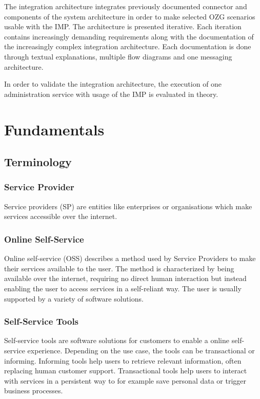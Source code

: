 \documentclass[
     12pt,         %
     a4paper,      %
     BCOR=10mm,version=first,     %
     DIV=14,version=first,        %
     ]{scrreprt}
\begin{document}
The integration architecture integrates previously documented connector and components of the system architecture in order to make selected OZG scenarios usable with the IMP. The architecture is presented iterative. Each iteration contains increasingly demanding requirements along with the documentation of the increasingly complex integration architecture. Each documentation is done through textual explanations, multiple flow diagrams and one messaging architecture.

In order to validate the integration architecture, the execution of one administration service with usage of the IMP is evaluated in theory.

\chapter{Fundamentals}

\section{Terminology}

\subsection{Service Provider}
Service providers (SP) are entities like enterprises or organisations which make services accessible over the internet.

\subsection{Online Self-Service}
Online self-service (OSS) describes a method used by Service Providers to make their services available to the user. The method is characterized by being available over the internet, requiring no direct human interaction but instead enabling the user to access services in a self-reliant way. The user is usually supported by a variety of software solutions.

\subsection{Self-Service Tools}
Self-service tools are software solutions for customers to enable a online self-service experience. Depending on the use case, the tools can be transactional or informing. Informing tools help users to retrieve relevant information, often replacing human customer support. Transactional tools help users to interact with services in a persistent way to for example save personal data or trigger business processes.
\end{document}
